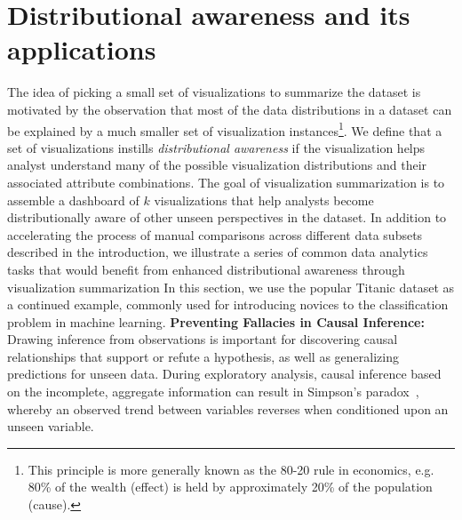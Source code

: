 \section{Distributional awareness and its applications\label{sec:distributionaware}}
The idea of picking a small set of visualizations to summarize the dataset is motivated by the observation that most of the data distributions in a dataset can be explained by a much smaller set of visualization instances\footnote{This principle is more generally known as the 80-20 rule in economics, e.g. 80\% of the wealth (effect) is held by approximately 20\% of the population (cause).}. We define that a set of visualizations instills \emph{ distributional awareness} if the visualization helps analyst understand many of the possible visualization distributions and their associated attribute combinations. The goal of visualization summarization is to assemble a dashboard of $k$ visualizations that help analysts become distributionally aware of other unseen perspectives in the dataset. In addition to accelerating the process of manual comparisons across different data subsets described in the introduction, we illustrate a series of common data analytics tasks that would benefit from enhanced distributional awareness through visualization summarization In this section, we use the popular Titanic dataset as a continued example, commonly used for introducing novices to the classification problem in machine learning\cite{titanic}.
\npar \textbf{Preventing Fallacies in Causal Inference:} Drawing inference from observations is important for discovering causal relationships that support or refute a hypothesis, as well as generalizing predictions for unseen data. During exploratory analysis, causal inference based on the incomplete, aggregate information can result in Simpson's paradox~\cite{Guo2017}, whereby an observed trend between variables reverses when conditioned upon an unseen variable.

